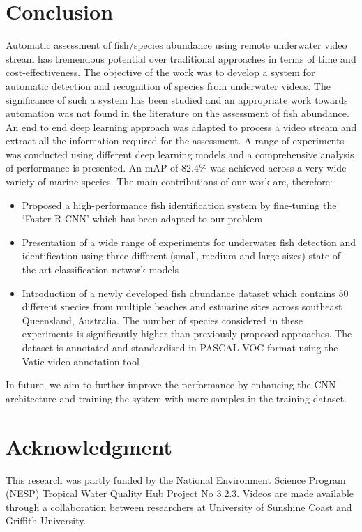 \documentclass[conference]{IEEEtran}       %
\begin{document}
\section{Conclusion}
\label{conclusion}
Automatic assessment of fish/species abundance using remote underwater video stream has tremendous potential over traditional approaches in terms of time and cost-effectiveness. The objective of the work was to develop a system for automatic detection and recognition of species from underwater videos. The significance of such a system has been studied and an appropriate work towards automation was not found in the literature on the assessment of fish abundance. An end to end deep learning approach was adapted to process a video stream and extract all the information required for the assessment. A range of experiments was conducted using different deep learning models and a comprehensive analysis of performance is presented. An mAP of 82.4\% was achieved across a very wide variety of marine species.
The main contributions of our work are, therefore:
\begin{itemize}
\item Proposed a high-performance fish identification system by fine-tuning the `Faster R-CNN' which has been adapted to our problem 
\item Presentation of a wide range of experiments for underwater fish detection and identification using three different (small, medium and large sizes) state-of-the-art classification network models
\item Introduction of a newly developed fish abundance dataset which contains 50 different species from multiple beaches and estuarine sites across southeast Queensland, Australia. The number of species considered in these experiments is significantly higher than previously proposed approaches. The dataset is annotated and standardised in PASCAL VOC \cite{Everingham15} format using the Vatic video annotation tool \cite{springerlink:10.1007/s11263-012-0564-1}.
\end{itemize}
In future, we aim to further improve the performance by enhancing the CNN architecture and training the system with more samples in the training dataset.
\section*{Acknowledgment}
This research was partly funded by the National Environment Science Program (NESP) Tropical Water Quality Hub Project No 3.2.3. Videos are made available through a collaboration between researchers at University of Sunshine Coast and Griffith University.
\end{document}
